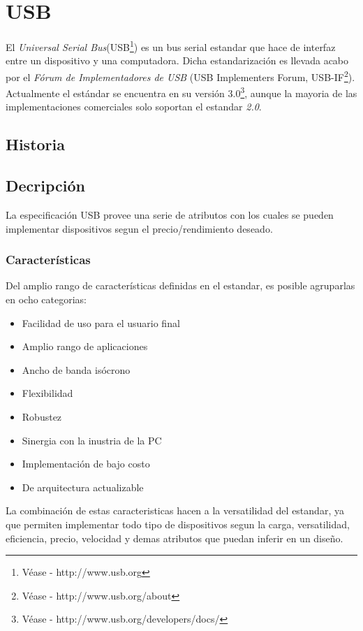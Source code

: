 \chapter{USB}
El \emph{Universal Serial Bus}(USB\footnote{V\'ease - http://www.usb.org}) es
un bus serial estandar que hace de interfaz entre un dispositivo y una
computadora.
Dicha estandarizaci\'on es llevada acabo por el \emph{F\'orum de
Implementadores de USB} (USB Implementers Forum, USB-IF\footnote{V\'ease -
http://www.usb.org/about}). 
Actualmente el est\'andar se encuentra en su versi\'on 3.0\footnote{V\'ease -
http://www.usb.org/developers/docs/}, aunque la mayoria de las
implementaciones comerciales solo soportan el estandar \emph{2.0}.

\section{Historia}

\section{Decripci\'on}
La especificaci\'on USB provee una serie de atributos con los cuales se pueden
implementar dispositivos segun el precio/rendimiento deseado.

\subsection{Caracter\'isticas}
Del amplio rango de caracter\'isticas definidas en el estandar, es posible
agruparlas en ocho categorias:

\begin{itemize}
 \item Facilidad de uso para el usuario final
 \item Amplio rango de aplicaciones
 \item Ancho de banda is\'ocrono
 \item Flexibilidad
 \item Robustez
 \item Sinergia con la inustria de la PC
 \item Implementaci\'on de bajo costo
 \item De arquitectura actualizable
\end{itemize}

La combinaci\'on de estas caracteristicas hacen a la versatilidad del
estandar, ya que permiten implementar todo tipo de dispositivos segun la
carga, versatilidad, eficiencia, precio, velocidad y demas atributos que
puedan inferir en un dise\~no.

